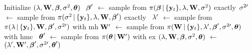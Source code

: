 
\begin{algorithmic}[1]
	\STATE Initialize $(\lambda, \mathbf{W}, \boldsymbol{\beta}, \sigma^2, \boldsymbol{\theta})$
	\WHILE{ \TRUE\ }
	\STATE $\hphantom{W'}\mathllap{\bbeta'}$		  $\gets$ sample from $\pi(\boldsymbol{\beta}\,|\,\{\mathbf{y}_{t}\},\lambda,\mathbf{W},\sigma^{2})$ exactly
	\STATE $\hphantom{W'}\mathllap{\sigma^{2\prime}}$ $\gets$ sample from $\pi(\sigma^{2}\,|\,\{\mathbf{y}_{t}\},\lambda,\mathbf{W},\boldsymbol{\beta}')$ exactly
	\STATE $\hphantom{W'}\mathllap{\lambda'}$		 $\gets$ sample from $\pi(\lambda\,|\,\{\mathbf{y}_{t}\},\mathbf{W},\boldsymbol{\beta}',\sigma^{2\prime})$ with \gls{mh}
	\STATE $\hphantom{W'}\mathllap{\WW'}$			 $\gets$ sample from $\pi(\mathbf{W}\,|\,\{\mathbf{y}_{t}\},\lambda',\boldsymbol{\beta}',\sigma^{2\prime},\boldsymbol{\theta})$ with \gls{hmc}
	\STATE $\hphantom{W'}\mathllap{\ttheta'}$		 $\gets$ sample from $\pi(\boldsymbol{\theta}\,|\,\mathbf{W}')$ with \gls{ex}
	\STATE $(\lambda,\mathbf{W},\boldsymbol{\beta},\sigma^2,\boldsymbol{\theta})$	$\gets$ $(\lambda',\mathbf{W}',\boldsymbol{\beta}',\sigma^{2\prime},\boldsymbol{\theta}')$
	\ENDWHILE
\end{algorithmic}
